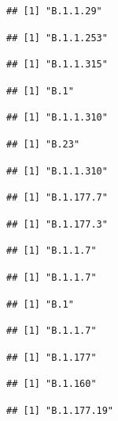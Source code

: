 \documentclass[]{article}
\begin{document}
\begin{verbatim}
## [1] "B.1.1.29"
\end{verbatim}

\begin{verbatim}
## [1] "B.1.1.253"
\end{verbatim}

\begin{verbatim}
## [1] "B.1.1.315"
\end{verbatim}

\begin{verbatim}
## [1] "B.1"
\end{verbatim}

\begin{verbatim}
## [1] "B.1.1.310"
\end{verbatim}

\begin{verbatim}
## [1] "B.23"
\end{verbatim}

\begin{verbatim}
## [1] "B.1.1.310"
\end{verbatim}

\begin{verbatim}
## [1] "B.1.177.7"
\end{verbatim}

\begin{verbatim}
## [1] "B.1.177.3"
\end{verbatim}

\begin{verbatim}
## [1] "B.1.1.7"
\end{verbatim}

\begin{verbatim}
## [1] "B.1.1.7"
\end{verbatim}

\begin{verbatim}
## [1] "B.1"
\end{verbatim}

\begin{verbatim}
## [1] "B.1.1.7"
\end{verbatim}

\begin{verbatim}
## [1] "B.1.177"
\end{verbatim}

\begin{verbatim}
## [1] "B.1.160"
\end{verbatim}

\begin{verbatim}
## [1] "B.1.177.19"
\end{verbatim}
\end{document}
